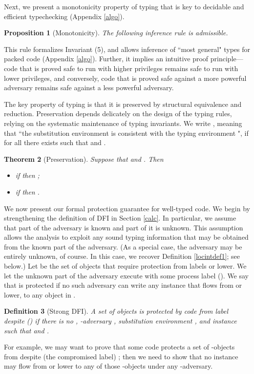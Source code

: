 \documentclass{sigplanconf}
\newtheorem{definition}{Definition}[section]
\newtheorem{theorem}[definition]{Theorem}
\newtheorem{proposition}[definition]{Proposition}
\begin{document}
Next, we present a monotonicity property of typing that is key to decidable and efficient typechecking (Appendix \ref{algo}). \begin{proposition}[Monotonicity]\label{mono} The following inference rule is admissible.

\end{proposition}
This rule formalizes Invariant (5), and allows inference of ``most general" types for packed code (Appendix \ref{algo}). Further, it implies an intuitive proof principle---code that is proved safe to run with higher privileges remains safe to run with lower privileges, and 
conversely, code that is proved safe against a more powerful adversary remains safe against a less powerful adversary. 

The key property of typing is that it is preserved by structural equivalence and reduction. Preservation depends delicately on the design of the typing rules, relying on the systematic maintenance of typing invariants. We write , meaning that ``the substitution environment  is consistent with the typing environment ", if for all  there exists  such that  and .

\begin{theorem}[Preservation]\label{subjred}
  Suppose that  and . Then 
\begin{itemize}
\item if  then ;
\item if  then .
\end{itemize}
\end{theorem}
We now present our formal protection guarantee for well-typed code. 
We begin by strengthening the definition of DFI in Section \ref{calc}. In particular, we assume that part of the adversary is known and part of it is unknown. This assumption allows the analysis to exploit any sound typing information that may be obtained from the known part of the adversary. (As a special case, the adversary may be entirely unknown, of course. In this case, we recover Definition \ref{locintdef1}; see below.) Let  be the set of objects that require protection from labels  or lower. We let the unknown part of the adversary execute with some process label  (). 
We say that  is protected if no such adversary can write any instance that flows from  or lower, to any object in .
\begin{definition}[Strong DFI]\label{locintdef} A set of objects  is protected by code  from label  despite  ()
  if there is no , -adversary , substitution environment , and instance  such that  and .
\end{definition}
For example, we may want to prove that some code protects a set of -objects from  despite (the compromised label) ; then we need to show that no instance may flow from  or lower to any of those -objects under any -adversary.
\end{document}
